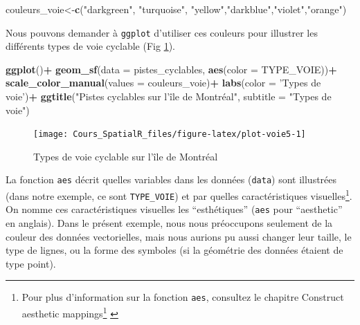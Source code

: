 \documentclass[
  12pt,
]{krantz}
\newenvironment{Shaded}{\begin{snugshade}}{\end{snugshade}}
\newcommand{\DataTypeTok}[1]{\textcolor[rgb]{0.13,0.29,0.53}{#1}}
\newcommand{\KeywordTok}[1]{\textcolor[rgb]{0.13,0.29,0.53}{\textbf{#1}}}
\newcommand{\NormalTok}[1]{#1}
\newcommand{\OperatorTok}[1]{\textcolor[rgb]{0.81,0.36,0.00}{\textbf{#1}}}
\newcommand{\StringTok}[1]{\textcolor[rgb]{0.31,0.60,0.02}{#1}}
\renewcommand{\href}[2]{#2\footnote{\url{#1}}}
\begin{document}
\begin{Shaded}
\begin{Highlighting}[]
\NormalTok{couleurs_voie<-}\KeywordTok{c}\NormalTok{(}\StringTok{"darkgreen"}\NormalTok{, }\StringTok{"turquoise"}\NormalTok{, }\StringTok{"yellow"}\NormalTok{,}\StringTok{"darkblue"}\NormalTok{,}\StringTok{"violet"}\NormalTok{,}\StringTok{"orange"}\NormalTok{)}
\end{Highlighting}
\end{Shaded}

Nous pouvons demander à \texttt{ggplot} d'utiliser ces couleurs pour illustrer les différents types de voie cyclable (Fig \ref{fig:plot-voie5}).

\begin{Shaded}
\begin{Highlighting}[]
\KeywordTok{ggplot}\NormalTok{()}\OperatorTok{+}
\StringTok{  }\KeywordTok{geom_sf}\NormalTok{(}\DataTypeTok{data =}\NormalTok{ pistes_cyclables,  }\KeywordTok{aes}\NormalTok{(}\DataTypeTok{color =}\NormalTok{ TYPE_VOIE))}\OperatorTok{+}
\StringTok{  }\KeywordTok{scale_color_manual}\NormalTok{(}\DataTypeTok{values =}\NormalTok{ couleurs_voie)}\OperatorTok{+}
\StringTok{  }\KeywordTok{labs}\NormalTok{(}\DataTypeTok{color =} \StringTok{'Types de voie'}\NormalTok{)}\OperatorTok{+}
\StringTok{  }\KeywordTok{ggtitle}\NormalTok{(}\StringTok{"Pistes cyclables sur l'île de Montréal"}\NormalTok{, }\DataTypeTok{subtitle =} \StringTok{"Types de voie"}\NormalTok{)}
\end{Highlighting}
\end{Shaded}

\begin{figure}

{\centering \texttt{[image: Cours\_SpatialR\_files/figure-latex/plot-voie5-1]} 

}

\caption{Types de voie cyclable sur l'île de Montréal}\label{fig:plot-voie5}
\end{figure}

La fonction \texttt{aes} décrit quelles variables dans les données (\texttt{data}) sont illustrées (dans notre exemple, ce sont \texttt{TYPE\_VOIE}) et par quelles
caractéristiques visuelles\footnote{Pour plus d'information sur la fonction \texttt{aes}, consultez le chapitre \href{https://ggplot2.tidyverse.org/reference/aes.html}{Construct aesthetic mappings} \citep{Wickham_ggplot2_2016}}. On nomme ces caractéristiques visuelles les ``esthétiques'' (\texttt{aes} pour ``aesthetic'' en anglais). Dans le présent exemple, nous nous préoccupons seulement de la couleur des données vectorielles, mais nous aurions pu aussi changer leur taille, le type de lignes, ou la forme des symboles (si la géométrie des données étaient de type point).
\end{document}
